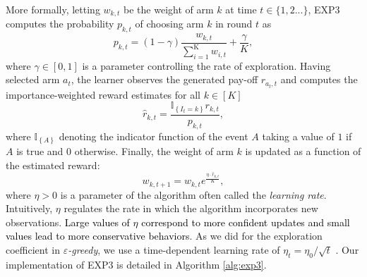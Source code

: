 \documentclass{article}
\begin{document}
	More formally, letting $w_{k,t}$ be the weight of arm $k$ at time $t \in \{1,2 ...\}$, EXP3 computes the probability $p_{k,t}$ of choosing arm $k$ in round $t$ as
	\begin{equation}
	\label{eq:exp3_prob}
	p_{k,t} = (1-\gamma) \frac{w_{k,t}}{\sum_{i=1}^{\text{K}}w_{i,t}} + \frac{\gamma}{K},
	\nonumber
	\end{equation}
	where $\gamma\in[0,1]$ is a parameter controlling the rate of exploration.
	Having selected arm $a_t$, the learner observes the generated pay-off $r_{a_t,t}$ and computes the importance-weighted reward estimates for all $k\in[K]$
	\begin{equation}
	\label{eq:exp3_estimated_reward}
	\widehat{r}_{k,t} = \frac{\mathbb{I}_{\left\{I_t = k\right\}}r_{k,t}}{p_{k,t}},
	\nonumber
	\end{equation}
	where $\mathbb{I}_{\left\{A \right\}}$ denoting the indicator function of the event $A$ taking a value of $1$ if $A$ is true and $0$ otherwise.
	Finally, the weight of arm $k$ is updated as a function of the estimated reward:
	\begin{equation}
	\label{eq:exp3_weights}
	w_{k,t+1}=w_{k,t} e^{\frac{\eta \cdot \widehat{r}_{k,t}}{K}},
	\nonumber
	\end{equation}	
	where $\eta>0$ is a parameter of the algorithm often called the \emph{learning rate}. Intuitively, $\eta$ regulates the rate in which the algorithm incorporates new observations. \textcolor{black}{Large values of $\eta$ correspond to more confident updates and small values lead to more conservative behaviors}. As we did for the exploration coefficient in \emph{$\varepsilon$-greedy}, we use a time-dependent learning rate of $\eta_t = \eta_0 / \sqrt{t}$ \cite{auer2002finite}. Our implementation of EXP3 is detailed in Algorithm \ref{alg:exp3}.
	
\end{document}
